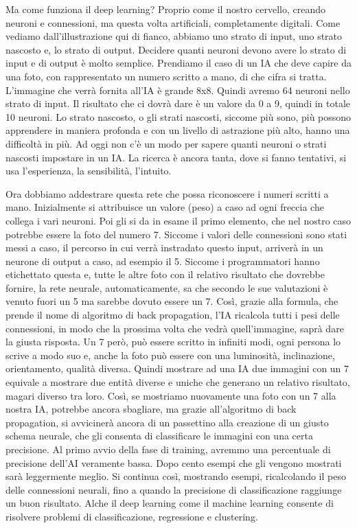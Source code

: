 \documentclass[12pt]{book} %
\begin{document}
Ma come funziona il deep learning? Proprio come il nostro cervello, creando neuroni e connessioni, ma questa volta
artificiali, completamente digitali. Come vediamo dall'illustrazione qui di fianco, abbiamo uno
strato di input, uno strato nascosto e, lo strato di output. Decidere quanti neuroni devono avere lo strato di input e
di output è molto semplice. Prendiamo il caso di un IA che deve capire da una foto, con rappresentato un numero scritto
a mano, di che cifra si tratta. L'immagine che verrà fornita all'IA è grande
8x8. Quindi avremo 64 neuroni nello strato di input. Il risultato che ci dovrà dare è un valore da 0 a 9, quindi in
totale 10 neuroni. Lo strato nascosto, o gli strati nascosti, siccome più sono, più possono apprendere in maniera
profonda e con un livello di astrazione più alto, hanno una difficoltà in più. Ad oggi non c'è un
modo per sapere quanti neuroni o strati nascosti impostare in un IA. La ricerca è ancora tanta, dove si fanno
tentativi, si usa l'esperienza, la sensibilità, l'intuito.

Ora dobbiamo addestrare questa rete che possa riconoscere i numeri scritti a mano. Inizialmente si attribuisce un valore
(peso) a caso ad ogni freccia che collega i vari neuroni. Poi gli si da in esame il primo elemento, che nel nostro caso
potrebbe essere la foto del numero 7. Siccome i valori delle connessioni sono stati messi a caso, il percorso in cui
verrà instradato questo input, arriverà in un neurone di output a caso, ad esempio il 5. Siccome i programmatori hanno
etichettato questa e, tutte le altre foto con il relativo risultato che dovrebbe fornire, la rete neurale,
automaticamente, sa che secondo le sue valutazioni è venuto fuori un 5 ma sarebbe dovuto essere un 7. Così, grazie alla
formula, che prende il nome di algoritmo di back propagation, l'IA ricalcola tutti i pesi delle
connessioni, in modo che la prossima volta che vedrà quell'immagine, saprà dare la giusta
risposta. Un 7 però, può essere scritto in infiniti modi, ogni persona lo scrive a modo suo e, anche la foto può essere
con una luminosità, inclinazione, orientamento, qualità diversa. Quindi mostrare ad una IA due immagini con un 7
equivale a mostrare due entità diverse e uniche che generano un relativo risultato, magari diverso tra loro. Così, se
mostriamo nuovamente una foto con un 7 alla nostra IA, potrebbe ancora sbagliare, ma grazie
all'algoritmo di back propagation, si avvicinerà ancora di un passettino alla creazione di un
giusto schema neurale, che gli consenta di classificare le immagini con una certa precisione. Al primo avvio della fase
di training, avremmo una percentuale di precisione dell'AI veramente bassa. Dopo cento esempi che
gli vengono mostrati sarà leggermente meglio. Si continua così, mostrando esempi, ricalcolando il peso delle
connessioni neurali, fino a quando la precisione di classificazione raggiunge un buon risultato. Alche il deep learning
come il machine learning consente di risolvere problemi di classificazione, regressione e clustering.
\end{document}
